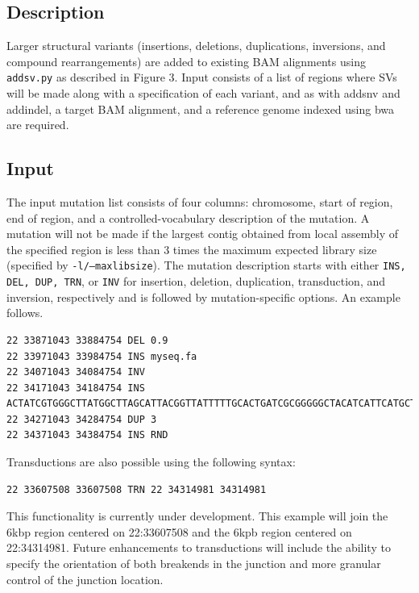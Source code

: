 \documentclass[letterpaper,11pt]{article}
\begin{document}
\subsection{Description}
   Larger structural variants (insertions, deletions, duplications, inversions, and compound rearrangements) are added to existing BAM alignments using \texttt{addsv.py} as described in Figure 3. Input consists of a list of regions where SVs will be made along with a specification of each variant, and as with addsnv and addindel, a target BAM alignment, and a reference genome indexed using bwa are required.

\subsection{Input}
    The input mutation list consists of four columns: chromosome, start of region, end of region, and a controlled-vocabulary description of the mutation. A mutation will not be made if the largest contig obtained from local assembly of the specified region is less than 3 times the maximum expected library size (specified by \texttt{-l/--maxlibsize}). The mutation description starts with either \texttt{INS, DEL, DUP, TRN}, or \texttt{INV} for insertion, deletion, duplication, transduction, and inversion, respectively and is followed by mutation-specific options. An example follows.

\begin{verbatim}
22 33871043 33884754 DEL 0.9
22 33971043 33984754 INS myseq.fa
22 34071043 34084754 INV
22 34171043 34184754 INS ACTATCGTGGGCTTATGGCTTAGCATTACGGTTATTTTTGCACTGATCGCGGGGGCTACATCATTCATGCTATTACTTGCGTATCGTA
22 34271043 34284754 DUP 3
22 34371043 34384754 INS RND
\end{verbatim}

Transductions are also possible using the following syntax:

\begin{verbatim}
22 33607508 33607508 TRN 22 34314981 34314981
\end{verbatim}

This functionality is currently under development. This example will join the 6kbp region centered on 22:33607508 and the 6kpb region centered on 22:34314981. Future enhancements to transductions will include the ability to specify the orientation of both breakends in the junction and more granular control of the junction location.
\end{document}
